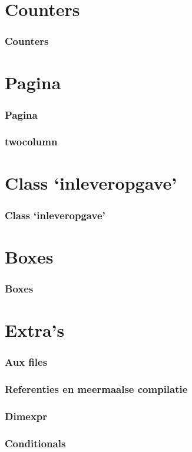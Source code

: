 \documentclass{cursuspresentatie}
\begin{document}
	\section{Counters}

	\begin{frame}
		\frametitle{Counters}
	\end{frame}

	\section{Pagina}

	\begin{frame}
		\frametitle{Pagina}
	\end{frame}

	\begin{frametitle}
		\frametitle{twocolumn}
	\end{frametitle}

	\section{Class `inleveropgave'}

	\begin{frame}
		\frametitle{Class `inleveropgave'}
	\end{frame}

	\section{Boxes}
	\begin{frame}
		\frametitle{Boxes}
	\end{frame}

	\section{Extra's}

	\begin{frame}
		\frametitle{Aux files}
	\end{frame}

	\begin{frame}
		\frametitle{Referenties en meermaalse compilatie}
	\end{frame}

	\begin{frame}
		\frametitle{Dimexpr}
	\end{frame}

	\begin{frame}
		\frametitle{Conditionals}
	\end{frame}
\end{document}
